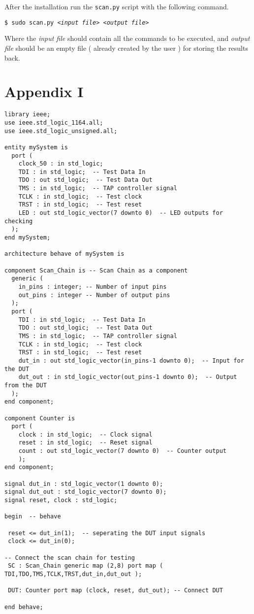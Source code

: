 \documentclass[a4paper,11pt]{article}
\begin{document}
After the installation run the \texttt{scan.py} script with the following command.
\begin{center}
\texttt{\$ sudo scan.py \textit{<input file>} \textit{<output file>}} 
\end{center}

Where the \textit{input file} should contain all the commands to be executed, and \textit{output file} should be an empty file ( already created by the user ) for storing the results back.



\newpage
\section*{Appendix I}
\begin{verbatim}
library ieee;
use ieee.std_logic_1164.all;
use ieee.std_logic_unsigned.all;

entity mySystem is
  port (
    clock_50 : in std_logic;
    TDI : in std_logic;  -- Test Data In
    TDO : out std_logic;  -- Test Data Out
    TMS : in std_logic;  -- TAP controller signal
    TCLK : in std_logic;  -- Test clock
    TRST : in std_logic;  -- Test reset
    LED : out std_logic_vector(7 downto 0)  -- LED outputs for checking
  );
end mySystem;

architecture behave of mySystem is

component Scan_Chain is	-- Scan Chain as a component
  generic (
    in_pins : integer; -- Number of input pins
    out_pins : integer -- Number of output pins
  );
  port (
    TDI : in std_logic;  -- Test Data In
    TDO : out std_logic;  -- Test Data Out
    TMS : in std_logic;  -- TAP controller signal
    TCLK : in std_logic;  -- Test clock
    TRST : in std_logic;  -- Test reset
    dut_in : out std_logic_vector(in_pins-1 downto 0);  -- Input for the DUT
    dut_out : in std_logic_vector(out_pins-1 downto 0);  -- Output from the DUT
  );
end component;

component Counter is
  port (
    clock : in std_logic;  -- Clock signal
    reset : in std_logic;  -- Reset signal
    count : out std_logic_vector(7 downto 0)  -- Counter output
    );
end component;

signal dut_in : std_logic_vector(1 downto 0);
signal dut_out : std_logic_vector(7 downto 0);
signal reset, clock : std_logic;

begin  -- behave

 reset <= dut_in(1);  -- seperating the DUT input signals
 clock <= dut_in(0);

-- Connect the scan chain for testing 
 SC : Scan_Chain generic map (2,8) port map ( TDI,TDO,TMS,TCLK,TRST,dut_in,dut_out );

 DUT: Counter port map (clock, reset, dut_out); -- Connect DUT
  
end behave;
\end{verbatim}
\end{document}
